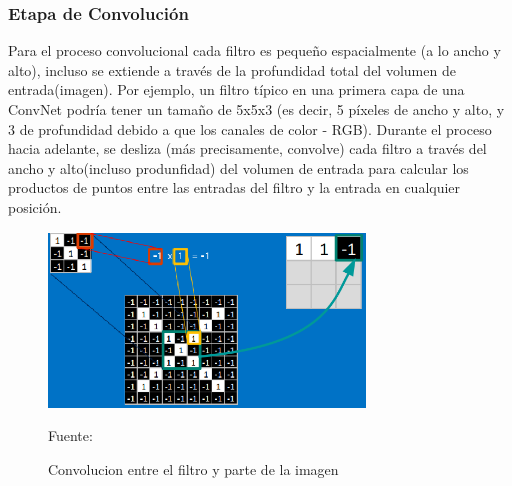 		\subsubsection {Etapa de Convolución} 
		  
		Para el proceso convolucional cada filtro es pequeño espacialmente (a lo ancho y alto), incluso se extiende a través de la profundidad total del volumen de entrada(imagen). Por ejemplo, un filtro típico en una primera capa de una ConvNet podría tener un tamaño de 5x5x3 (es decir, 5 píxeles de ancho y alto, y 3 de profundidad debido a que los canales de color - RGB). Durante el proceso hacia adelante, se desliza (más precisamente, convolve) cada filtro a través del ancho y alto(incluso produnfidad) del volumen de entrada para calcular los productos de puntos entre las entradas del filtro y la entrada en cualquier posición.

		\begin{figure}[H]
		\begin{center}
		\includegraphics[width=0.75\textwidth]{images/marcoteorico/generate_filt1}
		\end{center}
		\begin{center}
		\caption{\small{Convolucion entre el filtro y parte de la imagen}}
		\vskip -0.25cm
		{\small{Fuente: \citep{Rohrer}}}
		\end{center}
		\vspace{-1.9em}
		\end{figure}


